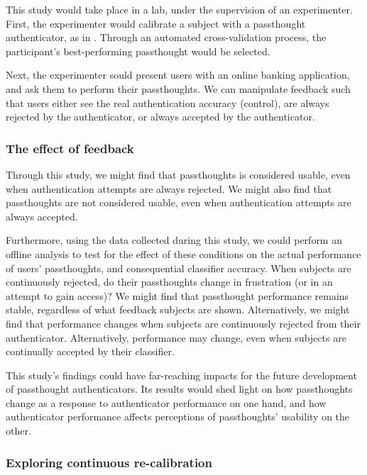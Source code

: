 \documentclass[sigconf]{acmart}
\begin{document}
This study would take place in a lab, under the supervision of an experimenter.
First, the experimenter would calibrate a subject with a passthought authenticator, as in \cite{Chuang2013b}.
Through an automated cross-validation process, the participant's best-performing passthought would be selected.

Next, the experimenter sould present users with an online banking application, and ask them to perform their passthoughts.
We can manipulate feedback such that users either see the real authentication accuracy (control), 
are always rejected by the authenticator, 
or always accepted by the authenticator.

\subsubsection{The effect of feedback}
\label{sec:org63fcbe5}

Through this study, we might find 
that passthoughts is considered usable, even when authentication attempts are always rejected.
We might also find that passthoughts are not considered usable, 
even when authentication attempts are always accepted.

Furthermore, using the data collected during this study, we could perform an offline analysis 
to test for the effect of these conditions on the actual performance of users' passthoughts, and consequential classifier accuracy.
When subjects are continuously rejected, do their passthoughts change in frustration (or in an attempt to gain access)?
We might find that passthought performance 
remains stable, regardless of what feedback subjects are shown.
Alternatively, we might find that performance changes 
when subjects are continuously rejected from their authenticator.
Alternatively, performance may change, 
even when subjects are continually accepted by their classifier.

This study's findings could have far-reaching impacts for the future development of passthought authenticators.
Its results would shed light on how passthoughts change as a response to authenticator performance on one hand,
and how authenticator performance affects perceptions of passthoughts' usability on the other.

\subsubsection{Exploring continuous re-calibration}
\label{sec:orgc3c28b6}
\end{document}
